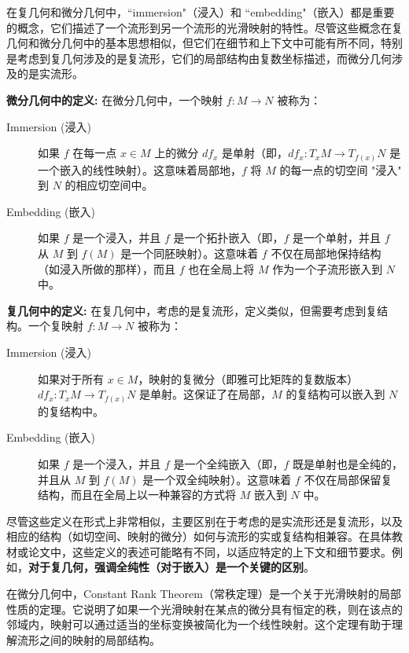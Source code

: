 \documentclass[lang=cn,zihao=-4,a4paper,fontset=none]{beautybook}
\begin{document}
\begin{definition}
    在复几何和微分几何中，``immersion"（浸入）和 ``embedding"（嵌入）都是重要的概念，它们描述了一个流形到另一个流形的光滑映射的特性。尽管这些概念在复几何和微分几何中的基本思想相似，但它们在细节和上下文中可能有所不同，特别是考虑到复几何涉及的是复流形，它们的局部结构由复数坐标描述，而微分几何涉及的是实流形。

    \textbf{微分几何中的定义:}
    在微分几何中，一个映射 \(f: M \to N\) 被称为：
    \begin{description}
        \item[Immersion (浸入)] 如果 \(f\) 在每一点 \(x \in M\) 上的微分 \(df_x\) 是单射（即，\(df_x: T_xM \to T_{f(x)}N\) 是一个嵌入的线性映射）。这意味着局部地，\(f\) 将 \(M\) 的每一点的切空间 "浸入" 到 \(N\) 的相应切空间中。
        \item[Embedding (嵌入)] 如果 \(f\) 是一个浸入，并且 \(f\) 是一个拓扑嵌入（即，\(f\) 是一个单射，并且 \(f\) 从 \(M\) 到 \(f(M)\) 是一个同胚映射）。这意味着 \(f\) 不仅在局部地保持结构（如浸入所做的那样），而且 \(f\) 也在全局上将 \(M\) 作为一个子流形嵌入到 \(N\) 中。
    \end{description}
    \tcblower
    \textbf{复几何中的定义:}
    在复几何中，考虑的是复流形，定义类似，但需要考虑到复结构。一个复映射 \(f: M \to N\) 被称为：
    \begin{description}
        \item[Immersion (浸入)] 如果对于所有 \(x \in M\)，映射的复微分（即雅可比矩阵的复数版本）\(df_x: T_xM \to T_{f(x)}N\) 是单射。这保证了在局部，\(M\) 的复结构可以嵌入到 \(N\) 的复结构中。
        \item[Embedding (嵌入)] 如果 \(f\) 是一个浸入，并且 \(f\) 是一个全纯嵌入（即，\(f\) 既是单射也是全纯的，并且从 \(M\) 到 \(f(M)\) 是一个双全纯映射）。这意味着 \(f\) 不仅在局部保留复结构，而且在全局上以一种兼容的方式将 \(M\) 嵌入到 \(N\) 中。
    \end{description}
    尽管这些定义在形式上非常相似，主要区别在于考虑的是实流形还是复流形，以及相应的结构（如切空间、映射的微分）如何与流形的实或复结构相兼容。在具体教材或论文中，这些定义的表述可能略有不同，以适应特定的上下文和细节要求。例如，\textbf{对于复几何，强调全纯性（对于嵌入）是一个关键的区别}。
\end{definition}

在微分几何中，Constant Rank Theorem（常秩定理）是一个关于光滑映射的局部性质的定理。它说明了如果一个光滑映射在某点的微分具有恒定的秩，则在该点的邻域内，映射可以通过适当的坐标变换被简化为一个线性映射。这个定理有助于理解流形之间的映射的局部结构。
\end{document}
